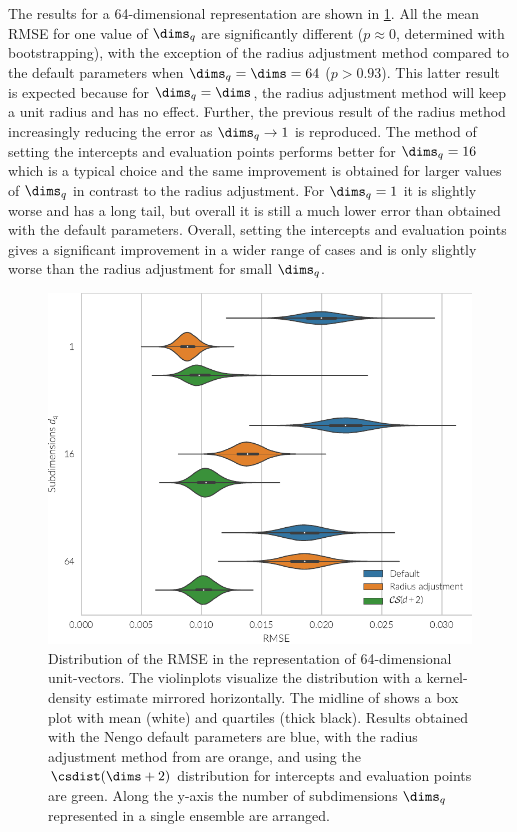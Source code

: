 The results for a 64-dimensional representation are shown in \cref{fig:spaopt-repr}.
All the mean RMSE for one value of $\dims_q$ are significantly different ($p \approx 0$, determined with bootstrapping), with the exception of the radius adjustment method compared to the default parameters when $\dims_q = \dims = 64$ ($p > 0.93$).
This latter result is expected because for $\dims_q = \dims$, the radius adjustment method will keep a unit radius and has no effect.
Further, the previous result of the radius method increasingly reducing the error as $\dims_q \rightarrow 1$ is reproduced.
The method of setting the intercepts and evaluation points performs better for $\dims_q = 16$ which is a typical choice and the same improvement is obtained for larger values of $\dims_q$ in contrast to the radius adjustment.
For $\dims_q = 1$ it is slightly worse and has a long tail, but overall it is still a much lower error than obtained with the default parameters.
Overall, setting the intercepts and evaluation points gives a significant improvement in a wider range of cases and is only slightly worse than the radius adjustment for small $\dims_q$.
\begin{figure}
    \centering
    \includegraphics{figures/spaopt-repr}
    \caption[Distribution of the RMSE in the representation of unit-vectors]{Distribution of the RMSE in the representation of 64-dimensional unit-vectors. The violinplots visualize the distribution with a kernel-density estimate mirrored horizontally. The midline of shows a box plot with mean (white) and quartiles (thick black). Results obtained with the Nengo default parameters are blue, with the radius adjustment method from \textcite{gosmann216} are orange, and using the $\csdist(\dims + 2)$ distribution for intercepts and evaluation points are green. Along the y-axis the number of subdimensions $\dims_q$ represented in a single ensemble are arranged.}\label{fig:spaopt-repr}
\end{figure}

